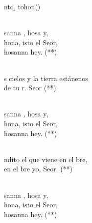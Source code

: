 \documentclass[12pt]{article}
\begin{document}
\begin{multicols*}{2}
\begin{cancion}[Santo][Zaireño]%
	nto, tohon()\\\jump\\
	\begin{chorus}%
	sanna , hosa y,\\
	hona, isto el Seor,\\
hosanna hey. (**)\\
	\end{chorus}%
	\jump\\
	s cielos y la tierra estánenos\\
	de tu r. Seor (**)\\\jump\\
	\begin{chorus}%
	sanna , hosa y,\\
	hona, isto el Seor,\\
hosanna hey. (**)\\
	\end{chorus}%
	\jump\\
	ndito el que viene en el bre,\\
	en el bre yo, Seor. (**)\\\jump\\
	\begin{chorus}%
	sanna , hosa y,\\
	hona, isto el Seor,\\
hosanna hey. (**)\\
	\end{chorus}%
	\jump\\
\end{cancion}%


\end{multicols*}
\end{document}
